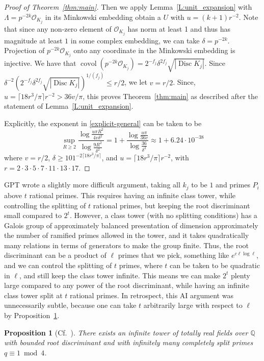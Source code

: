 \documentclass[11pt,reqno]{amsart}
\numberwithin{equation}{section}
\newtheorem{proposition}[proposition]{Proposition}
\theoremstyle{definition}
\theoremstyle{remark}
\newcommand{\on}{\operatorname}
\newcommand{\Q}{\mathbb{Q}}
\newcommand{\Disc}{\on{Disc}}
\renewcommand{\O}{\mathcal{O}}
\newcommand{\covol}{\on{covol}}
\begin{document}
\begin{proof}[Proof of Theorem~\ref{thm:main}]
Then we apply Lemma~\ref{L:unit_expansion} with $\Lambda=p^{-2k}\O_{K_j}$ in its Minkowski embedding obtain a $U$ with $u=(k+1)r^{-2}$.  Note that since any non-zero element of $\O_{K_j}$ has norm at least 1 and thus has magnitude at least $1$ in some complex embedding, we can take $\delta=p^{-2k}.$  Projection of $p^{-2k}\O_{K_j}$ onto any coordinate in the Minkowski embedding is injective.  
We have that $\covol(p^{-2k}\O_{K_j})=2^{-f_j}\delta^{2f_j} \sqrt{|\Disc K_j|}.$
 Since $\delta^{-2} (2^{-f_j}\delta^{2f_j} \sqrt{|\Disc K_j|})^{1/(f_j)}\leq r/2$, we let $v=r/2$.  Since, $u=\lceil 18r^3/\pi\rceil r^{-2}>36v/\pi$, this proves Theorem~\ref{thm:main} as described after the statement of Lemma~\ref{L:unit_expansion}. 

Explicitly, the exponent in \eqref{explicit-general}
can be taken to be
\begin{equation}
\label{explicit-special}
\sup_{R\ge 2} \frac{\log \frac{u \pi R^2}{4v\delta^{2}}}{\log \frac{9R^2}{\delta^2}}
= 1 + \frac{\log{\frac{u\pi}{36v}}}{\log{\frac{36}{\delta^2}}}\approx 1 + 6.24 \cdot 10^{-38}
\end{equation}
where $v=r/2$,
$\delta\ge 101^{-2\lceil 18r^3/\pi\rceil}$,
and $u=\lceil 18r^3/\pi\rceil r^{-2}$,
with $r = 2\cdot 3\cdot 5\cdot 7\cdot 11\cdot 13\cdot 17$.
\end{proof}


GPT wrote a slightly more difficult argument, taking all $k_j$ to be $1$ and primes $P_i$ above $t$ rational primes.  This requires having an infinite class tower, while controlling the splitting of $t$ rational primes, but keeping the root discriminant small compared to $2^t.$ However, a class tower (with no splitting conditions) has a Galois group of approximately balanced presentation of dimension approximately the number of ramified primes allowed in the tower, and it takes quadratically many relations in terms of generators to make the group finite. Thus, the root discriminant can be a product of $\ell$ primes that we pick, something like $e^{c\ell\log \ell}$, and we can control the splitting of $t$ primes, where $t$ can be taken to be quadratic in $\ell$, and still keep the class tower infinite.  This means we can make $2^t$ plenty large compared to any power of the root discriminant, while having an infinite class tower split at $t$ rational primes.
In retrospect, this AI argument was unnecessarily subtle,
because one can take $t$ arbitrarily large with respect to $\ell$
by Proposition~\ref{HMRmethod1mod4}.


\begin{proposition}
[Cf.~\cite{hajir2021cutting}]
\label{HMRmethod1mod4}
There exists an infinite tower of totally real fields over $\Q$
with bounded root discriminant
and with infinitely many completely split primes $q\equiv 1\bmod{4}$.
\end{proposition}
\end{document}
